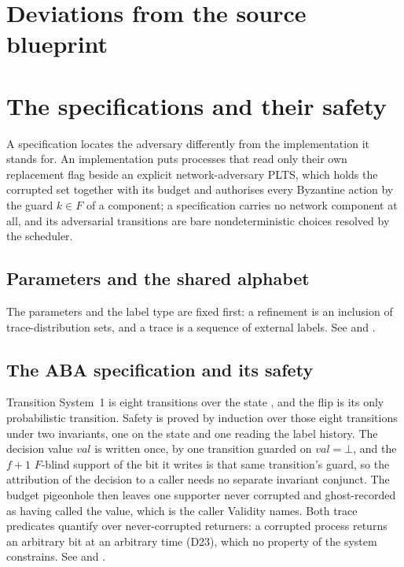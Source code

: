 \section{Deviations from the source blueprint}
\label{sec:aba-deviations}



\section{The specifications and their safety}

A specification locates the adversary differently from the implementation it stands for.
An implementation puts processes that read only their own replacement flag beside an explicit network-adversary PLTS, which holds the corrupted set together with its budget and authorises every Byzantine action by the guard $k \in F$ of a component; a specification carries no network component at all, and its adversarial transitions are bare nondeterministic choices resolved by the scheduler.

\subsection{Parameters and the shared alphabet}

The parameters and the label type are fixed first: a refinement is an inclusion of trace-distribution sets, and a trace is a sequence of external labels.
See  and .




\subsection{The ABA specification and its safety}

Transition System~1 is eight transitions over the state , and the flip is its only probabilistic transition.
Safety is proved by induction over those eight transitions under two invariants, one on the state and one reading the label history.
The decision value $val$ is written once, by one transition guarded on $val = \bot$, and the $f+1$ $F$-blind support of the bit it writes is that same transition's guard, so the attribution of the decision to a caller needs no separate invariant conjunct.
The budget pigeonhole then leaves one supporter never corrupted and ghost-recorded as having called the value, which is the caller Validity names.
Both trace predicates quantify over never-corrupted returners: a corrupted process returns an arbitrary bit at an arbitrary time (D23), which no property of the system constrains.
See  and .


